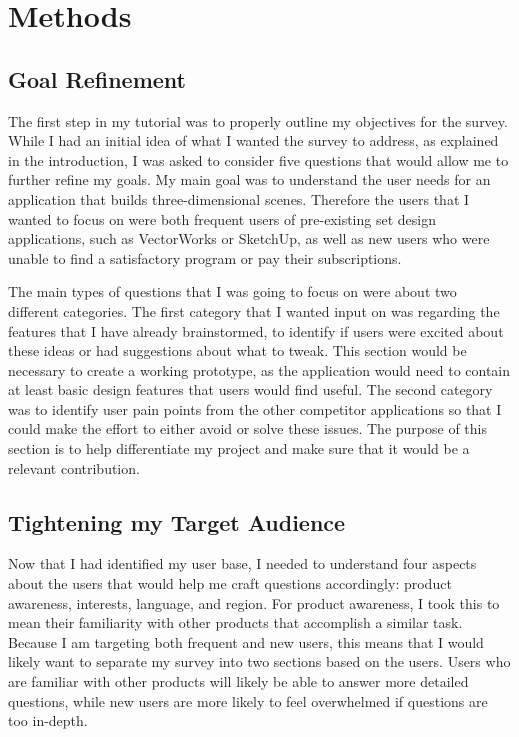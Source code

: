 \documentclass[10pt,twocolumn]{article}
\begin{document}
\section{Methods}
\subsection{Goal Refinement}
The first step in my tutorial was to properly outline my objectives for the survey. While I had an initial idea of what I wanted the survey to address, as explained in the introduction, I was asked to consider five questions that would allow me to further refine my goals. My main goal was to understand the user needs for an application that builds three-dimensional scenes. Therefore the users that I wanted to focus on were both frequent users of pre-existing set design applications, such as VectorWorks or SketchUp, as well as new users who were unable to find a satisfactory program or pay their subscriptions. 

The main types of questions that I was going to focus on were about two different categories. The first category that I wanted input on was regarding the features that I have already brainstormed, to identify if users were excited about these ideas or had suggestions about what to tweak. This section would be necessary to create a working prototype, as the application would need to contain at least basic design features that users would find useful. The second category was to identify user pain points from the other competitor applications so that I could make the effort to either avoid or solve these issues. The purpose of this section is to help differentiate my project and make sure that it would be a relevant contribution.   
\subsection{Tightening my Target Audience} 
Now that I had identified my user base, I needed to understand four aspects about the users that would help me craft questions accordingly: product awareness, interests, language, and region. For product awareness, I took this to mean their familiarity with other products that accomplish a similar task. Because I am targeting both frequent and new users, this means that I would likely want to separate my survey into two sections based on the users. Users who are familiar with other products will likely be able to answer more detailed questions, while new users are more likely to feel overwhelmed if questions are too in-depth.
 
\end{document}
